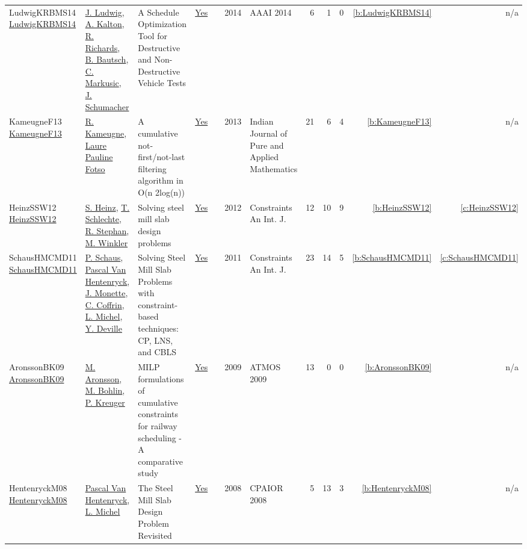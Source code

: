 {\begin{longtable}{>{\raggedright\arraybackslash}p{3cm}>{\raggedright\arraybackslash}p{6cm}>{\raggedright\arraybackslash}p{6.5cm}rrrp{2.5cm}rrrrr}
LudwigKRBMS14 \href{https://doi.org/10.1609/aaai.v28i2.19030}{LudwigKRBMS14} & \hyperref[auth:a1373]{J. Ludwig}, \hyperref[auth:a1374]{A. Kalton}, \hyperref[auth:a1375]{R. Richards}, \hyperref[auth:a1376]{B. Bautsch}, \hyperref[auth:a1377]{C. Markusic}, \hyperref[auth:a1378]{J. Schumacher} & A Schedule Optimization Tool for Destructive and Non-Destructive Vehicle Tests & \href{../works/LudwigKRBMS14.pdf}{Yes} & \cite{LudwigKRBMS14} & 2014 & AAAI 2014 & 6 & 1 & 0 & \ref{b:LudwigKRBMS14} & n/a\\
KameugneF13 \href{http://dx.doi.org/10.1007/s13226-013-0005-z}{KameugneF13} & \hyperref[auth:a10]{R. Kameugne}, \hyperref[auth:a131]{Laure Pauline Fotso} & A cumulative not-first/not-last filtering algorithm in O(n 2log(n)) & \href{../works/KameugneF13.pdf}{Yes} & \cite{KameugneF13} & 2013 & Indian Journal of Pure and Applied Mathematics & 21 & 6 & 4 & \ref{b:KameugneF13} & n/a\\
HeinzSSW12 \href{https://doi.org/10.1007/s10601-011-9113-8}{HeinzSSW12} & \hyperref[auth:a134]{S. Heinz}, \hyperref[auth:a140]{T. Schlechte}, \hyperref[auth:a141]{R. Stephan}, \hyperref[auth:a142]{M. Winkler} & Solving steel mill slab design problems & \href{../works/HeinzSSW12.pdf}{Yes} & \cite{HeinzSSW12} & 2012 & Constraints An Int. J. & 12 & 10 & 9 & \ref{b:HeinzSSW12} & \ref{c:HeinzSSW12}\\
SchausHMCMD11 \href{https://doi.org/10.1007/s10601-010-9100-5}{SchausHMCMD11} & \hyperref[auth:a148]{P. Schaus}, \hyperref[auth:a149]{Pascal Van Hentenryck}, \hyperref[auth:a150]{J. Monette}, \hyperref[auth:a151]{C. Coffrin}, \hyperref[auth:a32]{L. Michel}, \hyperref[auth:a152]{Y. Deville} & Solving Steel Mill Slab Problems with constraint-based techniques: CP, LNS, and {CBLS} & \href{../works/SchausHMCMD11.pdf}{Yes} & \cite{SchausHMCMD11} & 2011 & Constraints An Int. J. & 23 & 14 & 5 & \ref{b:SchausHMCMD11} & \ref{c:SchausHMCMD11}\\
AronssonBK09 \href{http://drops.dagstuhl.de/opus/volltexte/2009/2141}{AronssonBK09} & \hyperref[auth:a713]{M. Aronsson}, \hyperref[auth:a714]{M. Bohlin}, \hyperref[auth:a715]{P. Kreuger} & {MILP} formulations of cumulative constraints for railway scheduling - {A} comparative study & \href{../works/AronssonBK09.pdf}{Yes} & \cite{AronssonBK09} & 2009 & ATMOS 2009 & 13 & 0 & 0 & \ref{b:AronssonBK09} & n/a\\
HentenryckM08 \href{https://doi.org/10.1007/978-3-540-68155-7_41}{HentenryckM08} & \hyperref[auth:a149]{Pascal Van Hentenryck}, \hyperref[auth:a32]{L. Michel} & The Steel Mill Slab Design Problem Revisited & \href{../works/HentenryckM08.pdf}{Yes} & \cite{HentenryckM08} & 2008 & CPAIOR 2008 & 5 & 13 & 3 & \ref{b:HentenryckM08} & n/a\\

\end{longtable}}
